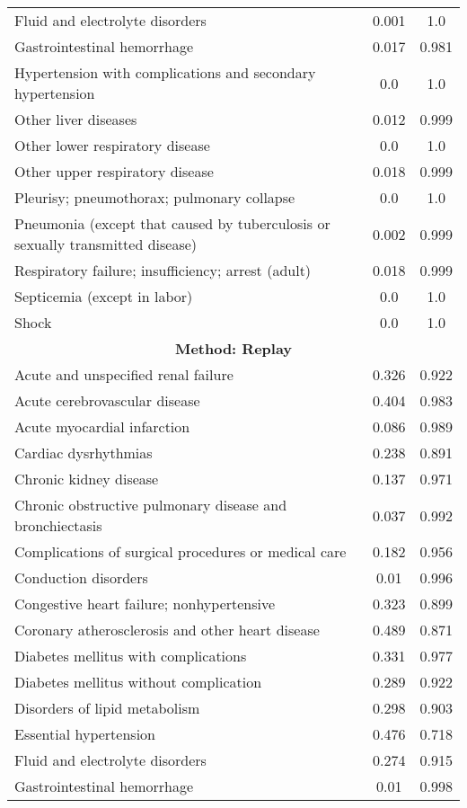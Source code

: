 \documentclass{article}
\begin{document}
\begin{longtable}{lcc}
Fluid and electrolyte disorders & 0.001 & 1.0 \\
Gastrointestinal hemorrhage & 0.017 & 0.981 \\
Hypertension with complications and secondary hypertension & 0.0 & 1.0 \\
Other liver diseases & 0.012 & 0.999 \\
Other lower respiratory disease & 0.0 & 1.0 \\
Other upper respiratory disease & 0.018 & 0.999 \\
Pleurisy; pneumothorax; pulmonary collapse & 0.0 & 1.0 \\
Pneumonia (except that caused by tuberculosis or sexually transmitted disease) & 0.002 & 0.999 \\
Respiratory failure; insufficiency; arrest (adult) & 0.018 & 0.999 \\
Septicemia (except in labor) & 0.0 & 1.0 \\
Shock & 0.0 & 1.0 \\
\midrule
\multicolumn{3}{c}{\textbf{Method: Replay}} \\
\midrule
Acute and unspecified renal failure & 0.326 & 0.922 \\
Acute cerebrovascular disease & 0.404 & 0.983 \\
Acute myocardial infarction & 0.086 & 0.989 \\
Cardiac dysrhythmias & 0.238 & 0.891 \\
Chronic kidney disease & 0.137 & 0.971 \\
Chronic obstructive pulmonary disease and bronchiectasis & 0.037 & 0.992 \\
Complications of surgical procedures or medical care & 0.182 & 0.956 \\
Conduction disorders & 0.01 & 0.996 \\
Congestive heart failure; nonhypertensive & 0.323 & 0.899 \\
Coronary atherosclerosis and other heart disease & 0.489 & 0.871 \\
Diabetes mellitus with complications & 0.331 & 0.977 \\
Diabetes mellitus without complication & 0.289 & 0.922 \\
Disorders of lipid metabolism & 0.298 & 0.903 \\
Essential hypertension & 0.476 & 0.718 \\
Fluid and electrolyte disorders & 0.274 & 0.915 \\
Gastrointestinal hemorrhage & 0.01 & 0.998 \\

\end{longtable}
\end{document}
